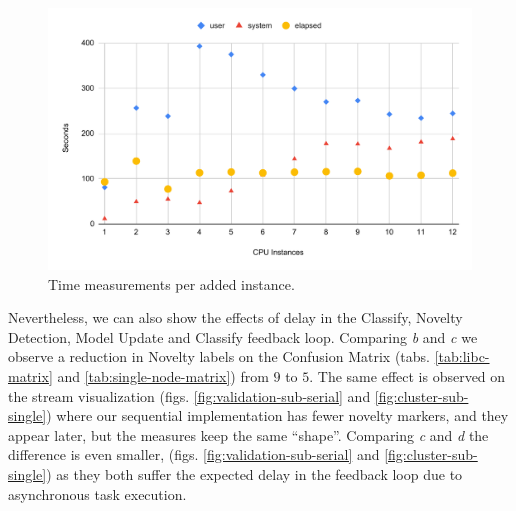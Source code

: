 \begin{figure}[hbt]
  \centering
  \includegraphics[width=0.7\linewidth,page=1]{speedup-clean.pdf}
  \caption{Time measurements per added instance.}
  \label{fig:speedup}
\end{figure}

Nevertheless, we can also show the effects of delay in the
Classify, Novelty Detection, Model Update and Classify feedback loop.
Comparing \emph{b} and \emph{c} we observe a reduction in Novelty labels
on the Confusion Matrix (tabs. \ref{tab:libc-matrix} and \ref{tab:single-node-matrix})
from $9$ to $5$.
The same effect is observed on the stream visualization (figs.
\ref{fig:validation-sub-serial} and \ref{fig:cluster-sub-single}) where our
sequential implementation has fewer novelty markers, and they appear later, but the
measures keep the same ``shape''.
Comparing \emph{c} and \emph{d} the difference is even smaller,
(figs. \ref{fig:validation-sub-serial} and \ref{fig:cluster-sub-single})
as they both suffer the expected delay in the feedback loop due to asynchronous
task execution.
